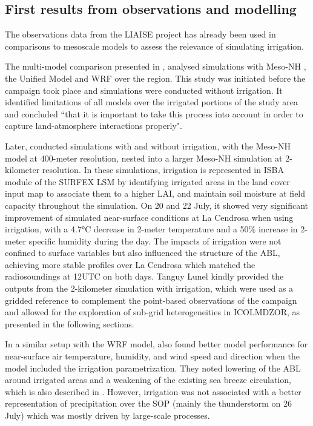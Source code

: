 \subsection{First results from observations and modelling}

The observations data from the LIAISE project has already been used in comparisons to mesoscale models to assess the relevance of simulating irrigation. 

The multi-model comparison presented in \citet{jimenez_land-surface_2025}, analysed simulations with Meso-NH  \citep{lac_overview_2018}, the Unified Model \citep{bush_second_2023,walters_met_2017} and WRF \citep{skamarock2021description} over the region. This study was initiated before the campaign took place and simulations were conducted without irrigation. It identified limitations of all models over the irrigated portions of the study area and concluded ``that it is important to take this process into account in order to capture land-atmosphere interactions properly".

Later, \citet{lunel_irrigation_2024} conducted simulations with and without irrigation, with the Meso-NH model at 400-meter resolution, nested into a larger Meso-NH simulation at 2-kilometer resolution. 
In these simulations, irrigation is represented in ISBA module of the SURFEX LSM \citep[Surface Externalisée,][]{masson_surfexv72_2013} by identifying irrigated areas in the land cover input map to associate them to a higher LAI, and maintain soil moisture at field capacity throughout the simulation.
On 20 and 22 July, it showed very significant improvement of simulated near-surface conditions at La Cendrosa when using irrigation, with a 4.7°C decrease in 2-meter temperature and a 50\% increase in 2-meter specific humidity during the day. The impacts of irrigation were not confined to surface variables but also influenced the structure of the ABL, achieving more stable profiles over La Cendrosa which matched the radiosoundings at 12UTC on both days. 
Tanguy Lunel kindly provided the outputs from the 2-kilometer simulation with irrigation, which were used as a gridded reference to complement the point-based observations of the campaign and allowed for the exploration of sub-grid heterogeneities in ICOLMDZOR, as presented in the following sections.

In a similar setup with the WRF model, \citet{udina_irrigation_2024} also found better model performance for near-surface air temperature, humidity, and wind speed and direction when the model included the irrigation parametrization. They noted lowering of the ABL around irrigated areas and a weakening of the existing sea breeze circulation, which is also described in \citet{lunel_marinada_2024}.
However, irrigation was not associated with a better representation of precipitation over the SOP (mainly the thunderstorm on 26 July) which was mostly driven by large-scale processes.

